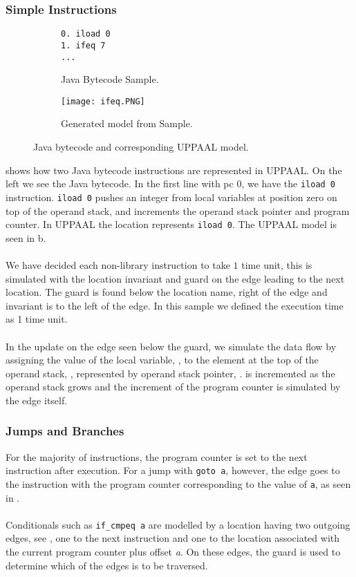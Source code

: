 \subsubsection{Simple Instructions}
\begin{figure}[H]
\centering
\begin{subfigure}{.3\textwidth}
  \begin{lstlisting}[numbers=none]
0. iload 0
1. ifeq 7
...
  \end{lstlisting}
  \caption{Java Bytecode Sample.}
\end{subfigure} 
\hspace{10px}
\begin{subfigure}{.6\textwidth}
  \texttt{[image: ifeq.PNG]}
  \caption{Generated model from Sample.}
\end{subfigure}
\caption{Java bytecode and corresponding UPPAAL model.}
\label{fig:uppaal1}
\end{figure}

 shows how two Java bytecode instructions are represented in UPPAAL. On the left we see the Java bytecode. In the first line with pc 0, we have the \texttt{iload 0} instruction. \texttt{iload 0} pushes an integer from local variables at position zero on top of the operand stack, and increments the operand stack pointer and program counter.
In UPPAAL the location  represents \texttt{iload 0}. The UPPAAL model is seen in b.\\\\
We have decided each non-library instruction to take $1$ time unit, this is simulated with the location invariant  and guard  on the edge leading to the next location. The guard is found below the location name, right of the edge and invariant is to the left of the edge. In this sample we defined the execution time as 1 time unit.\\\\
In the update on the edge seen below the guard, we simulate the data flow by assigning the value of the local variable, , to the element at the top of the operand stack, , represented by operand stack pointer, .  is incremented as the operand stack grows and the increment of the program counter is simulated by the edge itself.

\subsubsection{Jumps and Branches}
For the majority of instructions, the program counter is set to the next instruction after execution. For a jump with \texttt{goto a}, however, the edge goes to the instruction with the program counter corresponding to the value of \texttt{a}, as seen in .\\\\
Conditionals such as \texttt{if\_cmpeq a} are modelled by a location having two outgoing edges, see , one to the next instruction and one to the location associated with the current program counter plus offset \textit{a}. On these edges, the guard is used to determine which of the edges is to be traversed.

